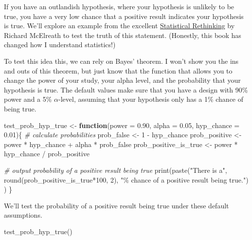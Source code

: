 \documentclass[
]{book}
\newenvironment{Shaded}{\begin{snugshade}}{\end{snugshade}}
\newcommand{\AttributeTok}[1]{\textcolor[rgb]{0.77,0.63,0.00}{#1}}
\newcommand{\CommentTok}[1]{\textcolor[rgb]{0.56,0.35,0.01}{\textit{#1}}}
\newcommand{\ControlFlowTok}[1]{\textcolor[rgb]{0.13,0.29,0.53}{\textbf{#1}}}
\newcommand{\DecValTok}[1]{\textcolor[rgb]{0.00,0.00,0.81}{#1}}
\newcommand{\FloatTok}[1]{\textcolor[rgb]{0.00,0.00,0.81}{#1}}
\newcommand{\FunctionTok}[1]{\textcolor[rgb]{0.00,0.00,0.00}{#1}}
\newcommand{\NormalTok}[1]{#1}
\newcommand{\OtherTok}[1]{\textcolor[rgb]{0.56,0.35,0.01}{#1}}
\newcommand{\SpecialCharTok}[1]{\textcolor[rgb]{0.00,0.00,0.00}{#1}}
\newcommand{\StringTok}[1]{\textcolor[rgb]{0.31,0.60,0.02}{#1}}
\begin{document}
If you have an outlandish hypothesis, where your hypothesis is unlikely to be true, you have a very low chance that a positive result indicates your hypothesis is true. We'll explore an example from the excellent \href{http://xcelab.net/rm/statistical-rethinking/}{Statistical Rethinking} by Richard McElreath to test the truth of this statement. (Honestly, this book has changed how I understand statistics!)

To test this idea this, we can rely on Bayes' theorem. I won't show you the ins and outs of this theorem, but just know that the function that allows you to change the power of your study, your alpha level, and the probability that your hypothesis is true. The default values make sure that you have a design with 90\% power and a 5\% \(\alpha\)-level, assuming that your hypothesis only has a 1\% chance of being true.

\begin{Shaded}
\begin{Highlighting}[]
\NormalTok{test\_prob\_hyp\_true }\OtherTok{\textless{}{-}} \ControlFlowTok{function}\NormalTok{(}\AttributeTok{power =} \FloatTok{0.90}\NormalTok{, }\AttributeTok{alpha =} \FloatTok{0.05}\NormalTok{, }\AttributeTok{hyp\_chance =} \FloatTok{0.01}\NormalTok{)\{}
  \CommentTok{\# calculate probabilities}
\NormalTok{  prob\_false }\OtherTok{\textless{}{-}} \DecValTok{1} \SpecialCharTok{{-}}\NormalTok{ hyp\_chance}
\NormalTok{  prob\_positive }\OtherTok{\textless{}{-}}\NormalTok{ power }\SpecialCharTok{*}\NormalTok{ hyp\_chance }\SpecialCharTok{+}\NormalTok{ alpha }\SpecialCharTok{*}\NormalTok{ prob\_false}
\NormalTok{  prob\_positive\_is\_true }\OtherTok{\textless{}{-}}\NormalTok{ power }\SpecialCharTok{*}\NormalTok{ hyp\_chance }\SpecialCharTok{/}\NormalTok{ prob\_positive}
  
  \CommentTok{\# output probability of a positive result being true}
  \FunctionTok{print}\NormalTok{(}\FunctionTok{paste}\NormalTok{(}\StringTok{"There is a"}\NormalTok{, }
              \FunctionTok{round}\NormalTok{(prob\_positive\_is\_true}\SpecialCharTok{*}\DecValTok{100}\NormalTok{, }\DecValTok{2}\NormalTok{), }
              \StringTok{"\% chance of a positive result being true."}\NormalTok{)}
\NormalTok{  )}
\NormalTok{\}}
\end{Highlighting}
\end{Shaded}

We'll test the probability of a positive result being true under these default assumptions.

\begin{Shaded}
\begin{Highlighting}[]
\FunctionTok{test\_prob\_hyp\_true}\NormalTok{()}
\end{Highlighting}
\end{Shaded}
\end{document}
